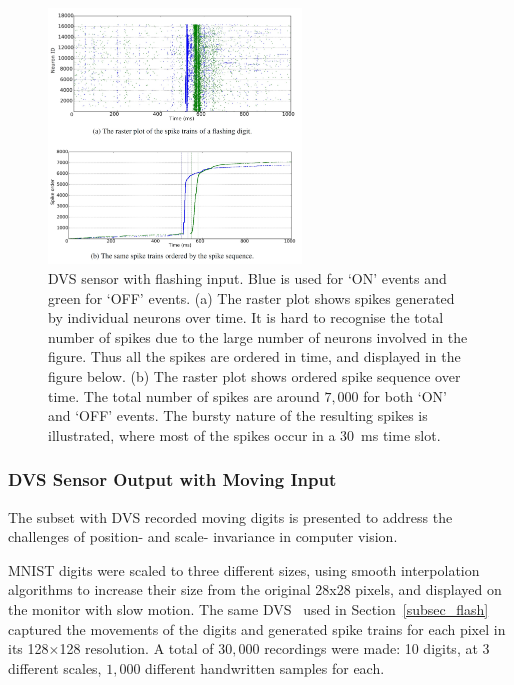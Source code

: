 \documentclass{frontiersENG} %
\begin{document}
\begin{figure}[hb!]
	\centering
	\includegraphics[width=0.6\textwidth]{fig5}	
	\caption{DVS sensor with flashing input.
	Blue is used for `ON' events and green for `OFF' events.
	(a) The raster plot shows spikes generated by individual neurons over time.
	It is hard to recognise the total number of spikes due to the large number of neurons involved in the figure.
	Thus all the spikes are ordered in time, and displayed in the figure below.
	(b) The raster plot shows ordered spike sequence over time.
	The total number of spikes are around $7,000$ for both `ON' and `OFF' events.
	The bursty nature of the resulting spikes is illustrated, where most of the spikes occur in a 30~ms time slot.}
	\label{fig:flash}
\end{figure}

\subsubsection{DVS Sensor Output with Moving Input}

The subset with DVS recorded moving digits is presented to address the challenges of position- and scale- invariance in computer vision.

MNIST digits were scaled to three different sizes, using smooth interpolation algorithms to increase their size from the original 28x28 pixels, and displayed on the monitor with slow motion. 
The same DVS~\citep{serrano2013128} used in Section~\ref{subsec_flash} captured the movements of the digits and generated spike trains for each pixel in its 128$\times$128 resolution.
A total of $30,000$ recordings were made: 10 digits, at 3 different scales, $1,000$ different handwritten samples for each.
\end{document}
